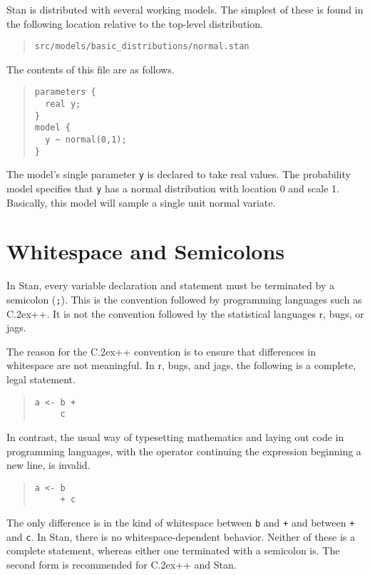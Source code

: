 \documentclass[10pt]{report}
\newcommand{\Stan}{Stan\xspace}
\newcommand*{\Cpp}{C\raise.2ex\hbox{\footnotesize ++}\xspace} %
\newcommand{\acronym}[1]{{\sc #1}\xspace}
\newcommand{\R}{\acronym{r}}
\newcommand{\BUGS}{\acronym{bugs}}
\newcommand{\JAGS}{\acronym{jags}}
\newcommand{\code}[1]{{\tt #1}}
\begin{document}
Stan is distributed with several working models.  The simplest of
these is found in the following location relative to the top-level
distribution.
%
\begin{quote}
\begin{Verbatim}
src/models/basic_distributions/normal.stan
\end{Verbatim}
\end{quote}
%
The contents of this file are as follows.
%
\begin{quote}
\begin{Verbatim}
parameters {
  real y;
}
model {
  y ~ normal(0,1);
}
\end{Verbatim}
\end{quote}
%
The model's single parameter \code{y} is declared to take real values.
The probability model specifies that \code{y} has a normal
distribution with location 0 and scale 1.  Basically, this model will
sample a single unit normal variate.  

\section{Whitespace and Semicolons}

In Stan, every variable declaration and statement must be terminated
by a semicolon (\code{;}).  This is the convention followed by
programming languages such as \Cpp.  It is not the convention followed
by the statistical languages \R, \BUGS, or \JAGS.  

The reason for the \Cpp convention is to ensure that differences in
whitespace are not meaningful.  In \R, \BUGS, and \JAGS, the following
is a complete, legal statement.
%
\begin{quote}
\begin{Verbatim}
a <- b +
     c
\end{Verbatim}
\end{quote}
%
In contrast, the usual way of typesetting mathematics and laying out
code in programming languages, with the operator continuing the
expression beginning a new line, is invalid.
%
\begin{quote}
\begin{Verbatim}
a <- b
     + c
\end{Verbatim}
\end{quote}
%
The only difference is in the kind of whitespace between \code{b} and
\code{+} and between \code{+} and \code{c}.  In \Stan, there is no
whitespace-dependent behavior.  Neither of these is a complete
statement, whereas either one terminated with a semicolon is.  The
second form is recommended for \Cpp and \Stan.
\end{document}

